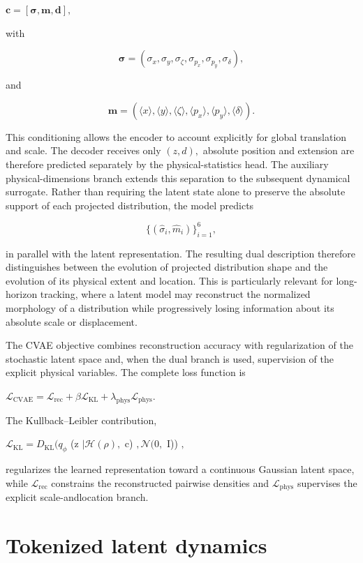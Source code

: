 \(\mathbf c=[\boldsymbol\sigma,\mathbf m,\mathbf d],\)

with

\[
\boldsymbol\sigma=(\sigma_x,\sigma_y,\sigma_\zeta,\sigma_{p_x},\sigma_{p_y},\sigma_\delta),
\]

and

\[
\mathbf m=(\langle x\rangle,\langle y\rangle,\langle\zeta\rangle,\langle p_x\rangle,\langle p_y\rangle,\langle\delta\rangle).
\]

This conditioning allows the encoder to account explicitly for global translation and scale. The decoder receives only \(( z , d ) ,\) absolute position and extension are therefore predicted separately by the physical-statistics head. The auxiliary physical-dimensions branch extends this separation to the subsequent dynamical surrogate. Rather than requiring the latent state alone to preserve the absolute support of each projected distribution, the model predicts

\[
\{(\widehat\sigma_i,\widehat m_i)\}_{i=1}^{6},
\]

in parallel with the latent representation. The resulting dual description therefore distinguishes between the evolution of projected distribution shape and the evolution of its physical extent and location. This is particularly relevant for long-horizon tracking, where a latent model may reconstruct the normalized morphology of a distribution while progressively losing information about its absolute scale or displacement.

The CVAE objective combines reconstruction accuracy with regularization of the stochastic latent space and, when the dual branch is used, supervision of the explicit physical variables. The complete loss function is

\(\mathcal{L}_{\mathrm{CVAE}} = \mathcal{L}_{\mathrm{rec}} + \beta \mathcal{L}_{\mathrm{KL}} + \lambda_{\mathrm{phys}} \mathcal{L}_{\mathrm{phys}} .\)

The Kullback–Leibler contribution,

\(\mathcal{L}_{\mathrm{KL}} = D_{\mathrm{KL}} ( q_{\phi}\) (z \(| \mathcal{H} ( \rho ) ,\) c) \(, \mathcal{N} ( 0 ,\) I)) \(,\)

regularizes the learned representation toward a continuous Gaussian latent space, while \(\mathcal{L}_{\mathrm{rec}}\) constrains the reconstructed pairwise densities and \(\mathcal{L}_{\mathrm{phys}}\) supervises the explicit scale-andlocation branch.

\section{Tokenized latent dynamics}
\label{sec:04_machine_learning_methodology_tokenized_latent_dynamics}

